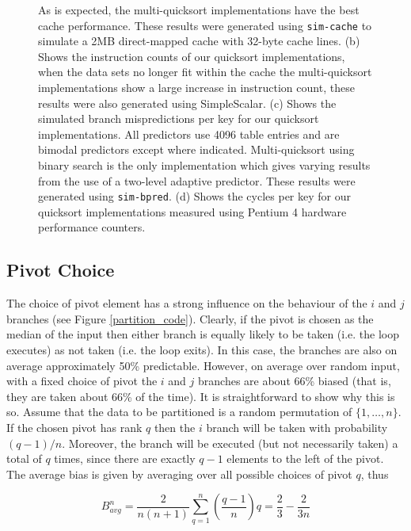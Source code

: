 \documentclass[acmtocl]{acmtrans2m}
\begin{document}
\begin{figure}
{As is expected, the multi-quicksort implementations have the best cache
performance. These results were generated using \texttt{sim-cache} to simulate a
2MB direct-mapped cache with 32-byte cache lines.  (b) Shows the instruction
counts of our quicksort implementations, when the data sets no longer fit within
the cache the multi-quicksort implementations show a large increase in
instruction count, these results were also generated using SimpleScalar. (c)
Shows the simulated branch mispredictions per key for our quicksort
implementations. All predictors use 4096 table entries and are bimodal
predictors except where indicated. Multi-quicksort using binary search is the
only implementation which gives varying results from the use of a two-level
adaptive predictor. These results were generated using \texttt{sim-bpred}. (d)
Shows the cycles per key for our quicksort implementations measured using
Pentium 4 hardware performance counters.  }
\label{quicksort_plots}
\end{figure}

\subsection{Pivot Choice}
\label{quicksort_pivot_choice}

The choice of pivot element has a strong influence on the behaviour of the $i$
and $j$ branches (see Figure \ref{partition_code}). Clearly, if the pivot is
chosen as the median of the input then either branch is equally likely to be
taken (i.e. the loop executes) as not taken (i.e.  the loop exits). In this
case, the branches are also on average approximately 50\% predictable.  However,
on average over random input, with a fixed choice of pivot the $i$ and $j$
branches are about 66\% biased (that is, they are taken about 66\% of the time).
It is straightforward to show why this is so. Assume that the data to be
partitioned is a random permutation of $\lbrace 1, \ldots, n \rbrace$.  If the
chosen pivot has rank $q$ then the $i$ branch will be taken with probability $(q
- 1)/n$.  Moreover, the branch will be executed (but not necessarily taken) a
total of $q$ times, since there are exactly $q - 1$ elements to the left of the
pivot. The average bias is given by averaging over all possible choices of pivot
$q$, thus

\begin{equation}
B_{avg}^n = \frac{2}{n(n + 1)}\sum_{q = 1}^n \left(\frac{q - 1}{n} \right) q = \frac{2}{3} - \frac{2}{3n} 
\label{bias_equation}\end{equation}
\end{document}

